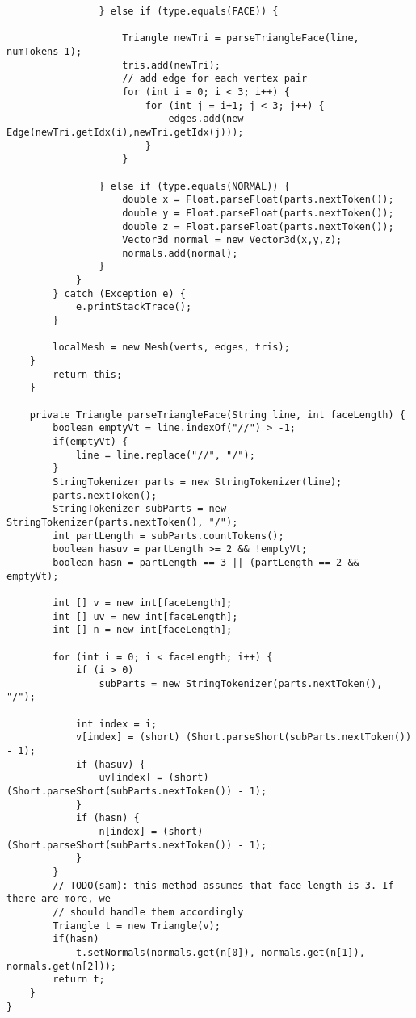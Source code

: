 \begin{lstlisting}
				} else if (type.equals(FACE)) {
					
					Triangle newTri = parseTriangleFace(line, numTokens-1);
					tris.add(newTri);
					// add edge for each vertex pair
					for (int i = 0; i < 3; i++) {
						for (int j = i+1; j < 3; j++) {
							edges.add(new Edge(newTri.getIdx(i),newTri.getIdx(j)));
						}
					}
					
				} else if (type.equals(NORMAL)) {
					double x = Float.parseFloat(parts.nextToken());
					double y = Float.parseFloat(parts.nextToken());
					double z = Float.parseFloat(parts.nextToken());
					Vector3d normal = new Vector3d(x,y,z);
					normals.add(normal);
				}  
			}
		} catch (Exception e) {
			e.printStackTrace();
		}
		
		localMesh = new Mesh(verts, edges, tris);
	}
		return this;
    }
	
	private Triangle parseTriangleFace(String line, int faceLength) {
		boolean emptyVt = line.indexOf("//") > -1;
		if(emptyVt) {
			line = line.replace("//", "/");
		}
		StringTokenizer parts = new StringTokenizer(line);
		parts.nextToken();
		StringTokenizer subParts = new StringTokenizer(parts.nextToken(), "/");
		int partLength = subParts.countTokens();
		boolean hasuv = partLength >= 2 && !emptyVt;
		boolean hasn = partLength == 3 || (partLength == 2 && emptyVt);
		
		int [] v = new int[faceLength];
		int [] uv = new int[faceLength];
		int [] n = new int[faceLength];
		
		for (int i = 0; i < faceLength; i++) {
			if (i > 0)
				subParts = new StringTokenizer(parts.nextToken(), "/");
			
			int index = i;
			v[index] = (short) (Short.parseShort(subParts.nextToken()) - 1);
			if (hasuv) {
				uv[index] = (short) (Short.parseShort(subParts.nextToken()) - 1);
			}
			if (hasn) {
				n[index] = (short) (Short.parseShort(subParts.nextToken()) - 1);
			}
		}
		// TODO(sam): this method assumes that face length is 3. If there are more, we 
		// should handle them accordingly
		Triangle t = new Triangle(v);
		if(hasn)
			t.setNormals(normals.get(n[0]), normals.get(n[1]), normals.get(n[2]));
		return t;
	}
}\end{lstlisting}


